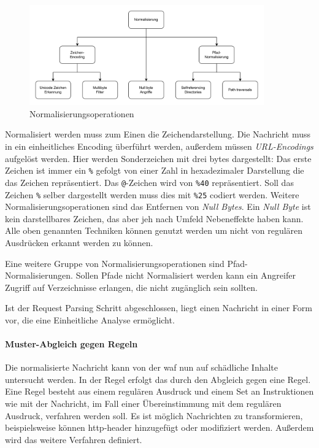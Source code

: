 \begin{figure}[!hbt]
    \centering
    \includegraphics[width=0.9\textwidth]{./images/Normalisierung.png}
    \caption{Normalisierungsoperationen}
    \label{fig:norming}
\end{figure}

Normalisiert werden muss zum Einen die Zeichendarstellung.
Die Nachricht muss in ein einheitliches Encoding überführt werden, außerdem müssen \textit{URL-Encodings} aufgelöst werden.
Hier werden Sonderzeichen mit drei bytes dargestellt:
Das erste Zeichen ist immer ein \verb|%| gefolgt von einer Zahl in hexadezimaler Darstellung die das Zeichen repräsentiert.
Das \verb|@|-Zeichen wird von \verb|%40| repräsentiert.
Soll das Zeichen \verb|%| selber dargestellt werden muss dies mit \verb|%25| codiert werden.
Weitere Normalisierungsoperationen sind das Entfernen von \textit{Null Bytes}.
Ein \textit{Null Byte} ist kein darstellbares Zeichen, das aber jeh nach Umfeld Nebeneffekte haben kann.
Alle oben genannten Techniken können genutzt werden um nicht von regulären Ausdrücken erkannt werden zu können.

Eine weitere Gruppe von Normalisierungsoperationen sind Pfad-Normalisierungen.
Sollen Pfade nicht Normalisiert werden kann ein Angreifer Zugriff auf Verzeichnisse erlangen, die nicht zugänglich sein sollten.

Ist der Request Parsing Schritt abgeschlossen, liegt einen Nachricht in einer Form vor, die eine Einheitliche Analyse ermöglicht.

\paragraph{Muster-Abgleich gegen Regeln}
Die normalisierte Nachricht kann von der \ac{waf} nun auf schädliche Inhalte untersucht werden.
In der Regel erfolgt das durch den Abgleich gegen eine Regel.
Eine Regel besteht aus einem regulären Ausdruck und einem Set an Instruktionen wie mit der Nachricht, im Fall einer Übereinstimmung mit dem regulären Ausdruck, verfahren werden soll.
Es ist möglich Nachrichten zu transformieren, beispielsweise können \ac{http}-header hinzugefügt oder modifiziert werden.
Außerdem wird das weitere Verfahren definiert.

